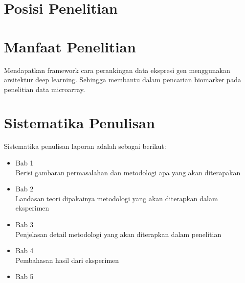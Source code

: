\section{Posisi Penelitian}




\section{Manfaat Penelitian}
Mendapatkan framework cara perankingan data ekspresi gen menggunakan arsitektur deep learning. Sehingga membantu dalam pencarian biomarker pada penelitian data microarray.

\section{Sistematika Penulisan}
Sistematika penulisan laporan adalah sebagai berikut:
\begin{itemize}
	\item Bab 1 \babSatu \\
	Berisi gambaran permasalahan dan metodologi apa yang akan diterapakan
	\item Bab 2 \babDua \\
	Landasan teori dipakainya metodologi yang akan diterapkan dalam eksperimen
	\item Bab 3 \babTiga \\
	Penjelasan detail metodologi yang akan diterapkan dalam penelitian
	\item Bab 4 \babEmpat \\
	Pembahasan hasil dari eksperimen
	\item Bab 5 \kesimpulan \\
\end{itemize}


